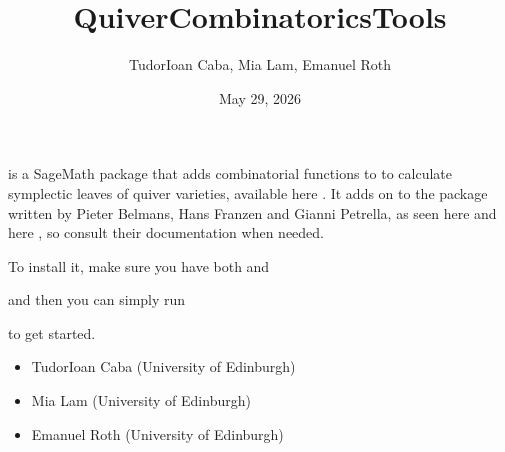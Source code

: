 \documentclass[letterpaper,10pt,english]{sphinxmanual}
\title{QuiverCombinatoricsTools}
\date{May 29, 2026}
\author{Tudor\sphinxhyphen{}Ioan Caba, Mia Lam, Emanuel Roth}
\begin{document}
\pagestyle{empty}
\sphinxmaketitle
\pagestyle{plain}
\sphinxtableofcontents
\pagestyle{normal}
\label{\detokenize{index::doc}}


\sphinxAtStartPar
{} is a SageMath package that adds combinatorial functions to  to calculate symplectic leaves of quiver varieties, available here . It adds on to the  package written by Pieter Belmans, Hans Franzen and Gianni Petrella, as seen here  and here , so consult their documentation when needed.

\sphinxAtStartPar
To install it, make sure you have both  and 

\begin{sphinxVerbatim}[commandchars=\\\{\}]
   
   
\end{sphinxVerbatim}

\sphinxAtStartPar
and then you can simply run

\begin{sphinxVerbatim}[commandchars=\\\{\}]
 
 
\end{sphinxVerbatim}

\sphinxAtStartPar
to get started.

\sphinxAtStartPar
{}
\begin{itemize}
\item {} 
\sphinxAtStartPar
Tudor\sphinxhyphen{}Ioan Caba (University of Edinburgh)

\item {} 
\sphinxAtStartPar
Mia Lam (University of Edinburgh)

\item {} 
\sphinxAtStartPar
Emanuel Roth (University of Edinburgh)

\end{itemize}
\end{document}
